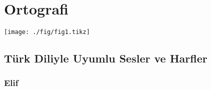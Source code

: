 \newcommand\uyumluharftablo[4]{%
  \begin{tabular}{>{\centering}p{0.15\textwidth}%
    >{\centering}p{0.15\textwidth}%
    >{\centering}p{0.25\textwidth}%
    >{\centering}p{0.25\textwidth}}
    \toprule
    \footnotesize Eski yazı harf
    & \footnotesize Vekil harf
    & \footnotesize Eski yazı harf ismi
    & \footnotesize Türkçe telaffuz
      \tabularnewline
      \midrule
    \begin{minipage}[c][10ex]{0.15\textwidth} \centering \Huge #1 \end{minipage}
    & \begin{minipage}[c][10ex]{0.15\textwidth} \centering \Huge #2 \end{minipage}
    & #3
    & \timesfont #4
      \tabularnewline
    \bottomrule
  \end{tabular}%
}

\newcommand\hariciharftablo[5]{%
  \begin{tabular}{>{\centering}p{0.15\textwidth}%
    >{\centering}p{0.15\textwidth}%
    >{\centering}p{0.20\textwidth}%
    >{\centering}p{0.17\textwidth}%
    >{\centering}p{0.17\textwidth}%
    }
    \toprule
    \footnotesize Eski yazı harf
    & \footnotesize Vekil harf
    & \footnotesize Eski yazı harf ismi
    & \footnotesize Türkçe telaffuz
    & \footnotesize Arapça telaffuz
      \tabularnewline
      \midrule
    \begin{minipage}[c][10ex]{0.15\textwidth} \centering \Huge #1 \end{minipage}
    & \begin{minipage}[c][10ex]{0.15\textwidth} \centering \Huge #2 \end{minipage}
    & #3
    & \timesfont #4
    & \timesfont #5
      \tabularnewline
    \bottomrule
  \end{tabular}%
}


\chapter{Ortografi}


% 
\texttt{[image: ./fig/fig1.tikz]}
\section{Türk Diliyle Uyumlu Sesler ve Harfler}

\subsection*{Elif}


